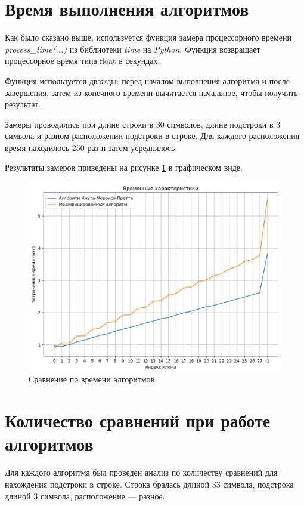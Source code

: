 \section{Время выполнения алгоритмов}

Как было сказано выше, используется функция замера процессорного времени  \textit{process\_time(...)} из библиотеки \textit{time} на \textit{Python}. 
Функция возвращает процессорное время типа float в секундах.

Функция используется дважды: перед началом выполнения алгоритма и после завершения, затем из конечного времени вычитается начальное, чтобы получить результат.

Замеры проводились при длине строки в 30 символов, длине подстроки в 3 символа и разном расположении подстроки в строке.
Для каждого расположения время находилось 250 раз и затем усреднялось.

Результаты замеров приведены на рисунке \ref{fig:graph_time} в графическом виде.

\begin{figure}[h!]
	\centering
	\includegraphics[width=0.8\linewidth]{img/time}
	\caption{Сравнение по времени алгоритмов}
	\label{fig:graph_time}
\end{figure}

\section[Количество сравнений при работе алгоритмов]{Количество сравнений при работе \\алгоритмов}

Для каждого алгоритма был проведен анализ по количеству сравнений для нахождения подстроки в строке.
Строка бралась длиной 33 символа, подстрока длиной 3 символа, расположение --- разное.

